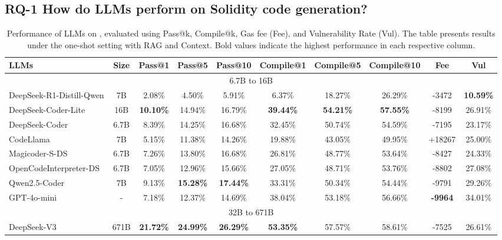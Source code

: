 \subsection{RQ-1 How do LLMs perform on Solidity code generation?}
\label{sec:rq1}


\begin{table*}[htbp!]
    \centering
    \caption{Performance of LLMs on \datasetname, evaluated using Pass@k, Compile@k, Gas fee (Fee), and Vulnerability Rate (Vul).
    The table presents results under the one-shot setting with RAG and Context. 
    Bold values indicate the highest performance in each respective column.}
    \resizebox{\linewidth}{!}
    {
        \begin{tabular}{lc|ccc|ccc|cc}
        \toprule
        LLMs & Size & Pass@1 & Pass@5 & Pass@10 & Compile@1 & Compile@5 & Compile@10 & Fee & Vul \\
        \midrule
        \multicolumn{10}{c}{\cellcolor{lightgray}6.7B to 16B} \\
        \midrule
        DeepSeek-R1-Distill-Qwen & 7B & 2.08\% & 4.50\% & 5.91\% & 6.37\% & 18.27\% & 26.29\% & -3472& \textbf{10.59\%}\\
        DeepSeek-Coder-Lite & 16B &   \textbf{10.10\%}&   14.94\%&   16.79\%&   \textbf{39.44\%}&   \textbf{54.21\%}& \textbf{57.55\%}& -8199& 26.91\%\\
        DeepSeek-Coder & 6.7B & 8.39\% & 14.25\% & 16.68\% & 32.45\% & 50.74\% & 54.59\% & -7195& 23.17\% \\
        CodeLlama & 7B & 5.15\% & 11.38\% & 14.26\% & 19.88\% & 43.05\% & 49.95\% & +18267& 25.00\% \\
        Magicoder-S-DS & 6.7B & 7.26\% & 13.80\% & 16.68\% & 26.81\% & 48.77\% & 53.64\% & -8427& 24.33\% \\
        OpenCodeInterpreter-DS & 6.7B & 7.05\% & 12.96\% & 15.66\% & 27.05\% & 48.71\% & 53.76\% & -8802& 27.08\%\\
        Qwen2.5-Coder & 7B & 9.13\% & \textbf{15.28\%}& \textbf{17.44\%}& 33.31\% & 50.34\% & 54.44\% & -9791& 29.26\% \\
        GPT-4o-mini & - & 7.18\% & 12.37\% & 14.69\% & 38.04\% & 53.18\% & 56.66\% & \textbf{-9964}& 34.01\%\\
        \midrule
        \multicolumn{10}{c}{\cellcolor{lightgray}32B to 671B} \\
        \midrule
        DeepSeek-V3 & 671B & \textbf{21.72\%}& \textbf{24.99\%}& \textbf{26.29\%}& \textbf{53.35\%}& 57.57\% & 58.61\% & -7525& 26.61\%\\

\end{tabular}}
\end{table*}
